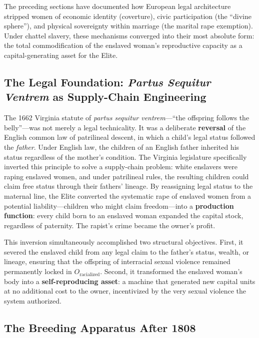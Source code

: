 \documentclass[12pt,openany]{book}
\begin{document}
The preceding sections have documented how European legal architecture stripped women of economic identity (coverture), civic participation (the ``divine sphere''), and physical sovereignty within marriage (the marital rape exemption). Under chattel slavery, these mechanisms converged into their most absolute form: the total commodification of the enslaved woman's reproductive capacity as a capital-generating asset for the Elite.

\subsection{The Legal Foundation: \textit{Partus Sequitur Ventrem} as Supply-Chain Engineering}

The 1662 Virginia statute of \textit{partus sequitur ventrem}---``the offspring follows the belly''---was not merely a legal technicality. It was a deliberate \textbf{reversal} of the English common law of patrilineal descent, in which a child's legal status followed the \textit{father}. Under English law, the children of an English father inherited his status regardless of the mother's condition. The Virginia legislature specifically inverted this principle to solve a supply-chain problem: white enslavers were raping enslaved women, and under patrilineal rules, the resulting children could claim free status through their fathers' lineage. By reassigning legal status to the maternal line, the Elite converted the systematic rape of enslaved women from a potential liability---children who might claim freedom---into a \textbf{production function}: every child born to an enslaved woman expanded the capital stock, regardless of paternity. The rapist's crime became the owner's profit.

This inversion simultaneously accomplished two structural objectives. First, it severed the enslaved child from any legal claim to the father's status, wealth, or lineage, ensuring that the offspring of interracial sexual violence remained permanently locked in $O_{\text{racialized}}$. Second, it transformed the enslaved woman's body into a \textbf{self-reproducing asset}: a machine that generated new capital units at no additional cost to the owner, incentivized by the very sexual violence the system authorized.

\subsection{The Breeding Apparatus After 1808}
\end{document}
